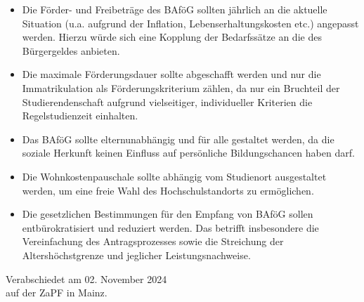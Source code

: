 \documentclass[DIV=calc]{scrartcl}
\begin{document}
\begin{itemize}
    \item Die Förder- und Freibeträge des BAföG sollten jährlich an die aktuelle Situation
(u.a. aufgrund der Inflation, Lebenserhaltungskosten etc.) angepasst werden. Hierzu
würde sich eine Kopplung der Bedarfssätze an die des Bürgergeldes anbieten.
    \item Die maximale Förderungsdauer sollte abgeschafft werden und nur die Immatrikulation
als Förderungskriterium zählen, da nur ein Bruchteil der Studierendenschaft aufgrund
vielseitiger, individueller Kriterien die Regelstudienzeit einhalten.
    \item Das BAföG sollte elternunabhängig und für alle gestaltet werden, da die soziale
Herkunft keinen Einfluss auf persönliche Bildungschancen haben darf.
    \item Die Wohnkostenpauschale sollte abhängig vom Studienort ausgestaltet werden, um eine
freie Wahl des Hochschulstandorts zu ermöglichen.
    \item Die gesetzlichen Bestimmungen für den Empfang von BAföG sollen entbürokratisiert
und reduziert werden. Das betrifft insbesondere die Vereinfachung des Antragsprozesses sowie die Streichung der Altershöchstgrenze und jeglicher Leistungsnachweise.
\end{itemize}


%
\vfill
\begin{flushright}
	Verabschiedet am 02. November 2024 \\
	auf der ZaPF in Mainz.
\end{flushright}
\end{document}
